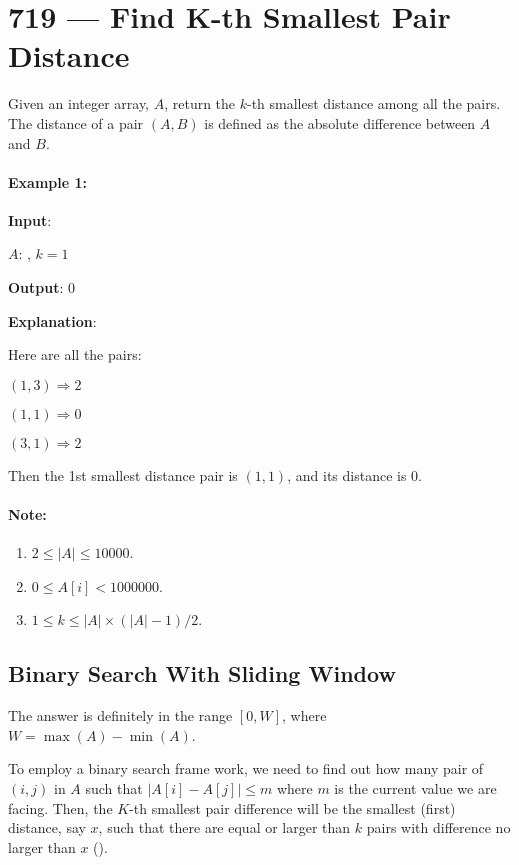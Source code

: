 \section{719 --- Find K-th Smallest Pair Distance}
Given an integer array, $A$, return the $k$-th smallest distance among all the pairs. The distance of a pair $(A, B)$ is defined as the absolute difference between $A$ and $B$.

\paragraph{Example 1:}
\begin{flushleft}


\textbf{Input}:

$A$:  \fcj{[1,3,1]},  $k = 1$

\textbf{Output}: 0 

\textbf{Explanation}:

Here are all the pairs:

$ (1,3) \Longrightarrow 2 $

$ (1,1) \Longrightarrow 0 $

$ (3,1) \Longrightarrow 2 $

Then the 1st smallest distance pair is $ (1,1) $, and its distance is 0.
\end{flushleft}

\paragraph{Note:}

\begin{enumerate}
\item $2 \leq \lvert A\rvert \leq 10000$.
\item $0 \leq A[i] < 1000000$.
\item $1 \leq k \leq \lvert A\rvert \times (\lvert A\rvert - 1) / 2$.

\end{enumerate}


\subsection{Binary Search With Sliding Window}
The answer is definitely in the range $[0, W]$, where $W = \max(A) - \min(A)$.

To employ a binary search frame work, we need to find out how many pair of $(i,j)$ in $A$ such that $\lvert A[i] -A[j]\rvert \leq m$ where $m$ is the current value we are facing. Then, the $K$-th smallest pair difference will be the smallest (first) distance, say $x$, such that there are equal or larger than $k$ pairs with difference no larger than $x$ (). 

